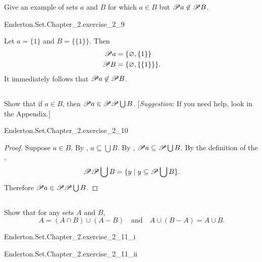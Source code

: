 \documentclass{report}
\begin{document}
  Give an example of sets $a$ and $B$ for which $a \in B$ but
    $\mathscr{P}a \not\in \mathscr{P}B$.

    {Enderton.Set.Chapter\_2.exercise\_2\_9}

  \begin{answer}
    Let $a = \{1\}$ and $B = \{\{1\}\}$.
    Then
      \begin{align*}
        \mathscr{P}a & = \{\varnothing, \{1\}\} \\
        \mathscr{P}B & = \{\varnothing, \{\{1\}\}\}.
      \end{align*}
    It immediately follows that $\mathscr{P}a \not\in \mathscr{P}B$.
  \end{answer}

\subsection{}%

  Show that if $a \in B$, then
    $\mathscr{P}a \in \mathscr{P}\mathscr{P}\bigcup B$.
  [\textit{Suggestion}: If you need help, look in the Appendix.]

    {Enderton.Set.Chapter\_2.exercise\_2\_10}

  \begin{proof}
    Suppose $a \in B$.
    By , $a \subseteq \bigcup B$.
    By ,
      $\mathscr{P}a \subseteq \mathscr{P}\bigcup B$.
    By the definition of the ,
      $$\mathscr{P}\mathscr{P}\bigcup B =
        \{ y \mid y \subseteq \mathscr{P}\bigcup B \}.$$
    Therefore $\mathscr{P}a \in \mathscr{P}\mathscr{P}\bigcup B$.
  \end{proof}

\subsection{}%

  Show that for any sets $A$ and $B$,
    $$A = (A \cap B) \cup (A - B) \quad\text{and}\quad
      A \cup (B - A) = A \cup B.$$

    {Enderton.Set.Chapter\_2.exercise\_2\_11\_i}

    {Enderton.Set.Chapter\_2.exercise\_2\_11\_ii}
\end{document}
